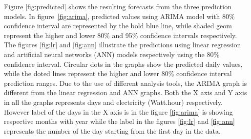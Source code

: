 Figure \ref{fig:predicted} shows the resulting forecasts from the three prediction models. In figure~\ref{fig:arima}, predicted values using ARIMA model with 80\% confidence interval  are represented by the bold blue line, while shaded geom represent the higher and lower 80\% and 95\% confidence intervals respectively. The figures \ref{fig:lr} and \ref{fig:ann} illustrate the predictions using linear regression and artificial neural networks (ANN) models respectively using the 80\% confidence interval. Circular dots in the graphs show the predicted daily values, while the doted lines represent the higher and lower 80\% confidence interval prediction ranges. Due to the use of different analysis tools, the ARIMA graph is different from the linear regression and ANN graphs. Both the X axis and Y axis in all the graphs represents days and electricity  (Watt.hour) respectively. However label of the days in the X axis is in the figure \ref{fig:arima} is showing respective months with year while the label in the figures \ref{fig:lr} and \ref{fig:ann} represents the number of the day starting from the first day in the data.  
 \\

